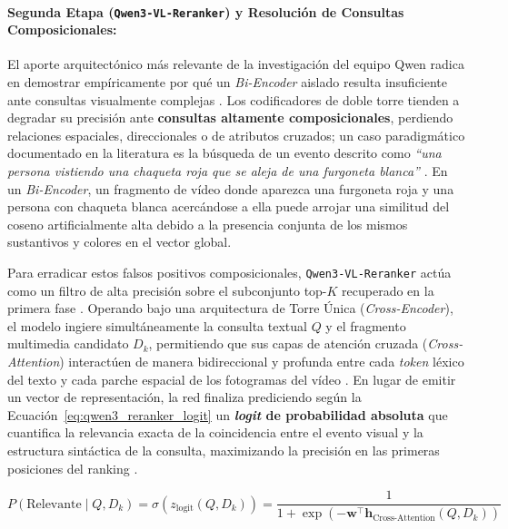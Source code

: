 \paragraph{Segunda Etapa (\texttt{Qwen3-VL-Reranker}) y Resolución de Consultas Composicionales:}
El aporte arquitectónico más relevante de la investigación del equipo Qwen radica en demostrar empíricamente por qué un \textit{Bi-Encoder} aislado resulta insuficiente ante consultas visualmente complejas \cite{learnopencv_qwen3, qwen3_vl_emb2026}. %
Los codificadores de doble torre tienden a degradar su precisión ante \textbf{consultas altamente composicionales}, perdiendo relaciones espaciales, direccionales o de atributos cruzados; un caso paradigmático documentado en la literatura es la búsqueda de un evento descrito como \textit{``una persona vistiendo una chaqueta roja que se aleja de una furgoneta blanca''} \cite{learnopencv_qwen3}. %
En un \textit{Bi-Encoder}, un fragmento de vídeo donde aparezca una furgoneta roja y una persona con chaqueta blanca acercándose a ella puede arrojar una similitud del coseno artificialmente alta debido a la presencia conjunta de los mismos sustantivos y colores en el vector global. %

Para erradicar estos falsos positivos composicionales, \texttt{Qwen3-VL-Reranker} actúa como un filtro de alta precisión sobre el subconjunto top-$K$ recuperado en la primera fase \cite{learnopencv_qwen3, qwen3_vl_emb2026}. %
Operando bajo una arquitectura de Torre Única (\textit{Cross-Encoder}), el modelo ingiere simultáneamente la consulta textual $Q$ y el fragmento multimedia candidato $D_k$, permitiendo que sus capas de atención cruzada (\textit{Cross-Attention}) interactúen de manera bidireccional y profunda entre cada \textit{token} léxico del texto y cada parche espacial de los fotogramas del vídeo \cite{learnopencv_qwen3, qwen3_vl_emb2026}. %
En lugar de emitir un vector de representación, la red finaliza prediciendo según la Ecuación~\eqref{eq:qwen3_reranker_logit} un \textbf{\textit{logit} de probabilidad absoluta} que cuantifica la relevancia exacta de la coincidencia entre el evento visual y la estructura sintáctica de la consulta, maximizando la precisión en las primeras posiciones del ranking \cite{learnopencv_qwen3, qwen3_vl_emb2026}. %

\begin{equation}
P(\text{Relevante} \mid Q, D_k) = \sigma\!\left(z_{\text{logit}}(Q, D_k)\right) = \frac{1}{1 + \exp\!\left(-\mathbf{w}^\top \mathbf{h}_{\text{Cross-Attention}}(Q, D_k)\right)}
\label{eq:qwen3_reranker_logit}
\end{equation} %

